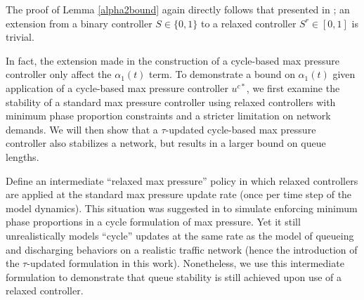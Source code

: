 The proof of Lemma \ref{alpha2bound} again directly follows that presented in \cite{MaxPressureStochastic}; an extension from a binary controller $S\in \{0,1\}$ to a relaxed controller $S^r\in [0,1]$ is trivial. 

In fact, the extension made in the construction of a cycle-based max pressure controller only affect the $\alpha_1 (t)$ term. To demonstrate a bound on $\alpha_1(t)$ given application of a cycle-based max pressure controller $u^{c*}$, we first examine the stability of a standard max pressure controller using relaxed controllers with minimum phase proportion constraints and a stricter limitation on network demands. We will then show that a $\tau$-updated cycle-based max pressure controller also stabilizes a network, but results in a larger bound on queue lengths. 

Define an intermediate ``relaxed max pressure'' policy in which relaxed controllers are applied at the standard max pressure update rate (once per time step of the model dynamics). 
This situation was suggested in \cite{MaxPressureStochastic} to simulate enforcing minimum phase proportions in a cycle formulation of max pressure. Yet it still unrealistically models ``cycle'' updates at the same rate as the model of queueing and discharging behaviors on a realistic traffic network (hence the introduction of the $\tau$-updated formulation in this work). Nonetheless, we use this intermediate formulation to demonstrate that queue stability is still achieved upon use of a relaxed controller. 

